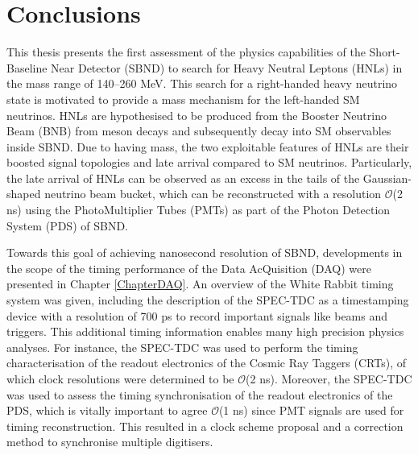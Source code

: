 
\chapter{Conclusions}  %


This thesis presents the first assessment of the physics capabilities of the Short-Baseline Near Detector (SBND) to search for Heavy Neutral Leptons (HNLs) in the mass range of 140--260 MeV.
This search for a right-handed heavy neutrino state is motivated to provide a mass mechanism for the left-handed SM neutrinos.
HNLs are hypothesised to be produced from the Booster Neutrino Beam (BNB) from meson decays and subsequently decay into SM observables inside SBND. 
Due to having mass, the two exploitable features of HNLs are their boosted signal topologies and late arrival compared to SM neutrinos.
Particularly, the late arrival of HNLs can be observed as an excess in the tails of the Gaussian-shaped neutrino beam bucket, which can be reconstructed with a resolution $\mathcal{O}$(2 ns) using the PhotoMultiplier Tubes (PMTs) as part of the Photon Detection System (PDS) of SBND.

Towards this goal of achieving nanosecond resolution of SBND, developments in the scope of the timing performance of the Data AcQuisition (DAQ) were presented in Chapter \ref{ChapterDAQ}.
An overview of the White Rabbit timing system was given, including the description of the SPEC-TDC as a timestamping device with a resolution of 700 ps to record important signals like beams and triggers.
This additional timing information enables many high precision physics analyses.
For instance, the SPEC-TDC was used to perform the timing characterisation of the readout electronics of the Cosmic Ray Taggers (CRTs), of which clock resolutions were determined to be $\mathcal{O}$(2 ns).
Moreover, the SPEC-TDC was used to assess the timing synchronisation of the readout electronics of the PDS, which is vitally important to agree $\mathcal{O}$(1 ns) since PMT signals are used for timing reconstruction.
This resulted in a clock scheme proposal and a correction method to synchronise multiple digitisers.

